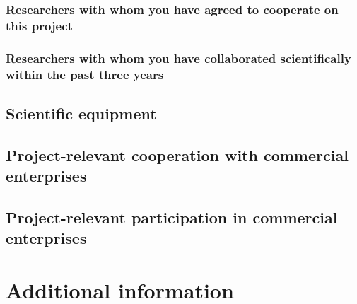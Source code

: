 \documentclass{scrartcl}
\begin{document}
\subsubsection{Researchers with whom you have agreed to cooperate on this project}

\subsubsection{Researchers with whom you have collaborated scientifically within the past three years}

\subsection{Scientific equipment}

\subsection{Project-relevant cooperation with commercial enterprises}

\subsection{Project-relevant participation in commercial enterprises}

\section{Additional information}
\end{document}
